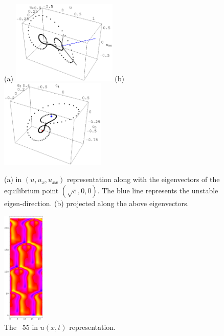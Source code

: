 \begin{figure}[t]
\begin{center}
(a) \includegraphics[width=5.0cm]{figs/1wSteadyE.eps}
\hspace{0.1in}
(b) \includegraphics[width=5.0cm]{figs/1wSteadyP.eps}
\end{center}
\caption{
(a)  in $(u,u_x,u_{xx})$ representation along with the eigenvectors of the equilibrium
point $(\sqrt{c},0,0)$. The blue line represents the unstable eigen-direction.
(b)  projected along the above eigenvectors.
}
\label{f:1wSteady}
\end{figure}


\begin{figure}[t]
\begin{center}
    \includegraphics[width=0.18\textwidth]{figs/rpo22-55-4-u.eps}
\end{center}
\caption{
 The \rpo\ {\nameit}55 in $u(x,t)$ representation.
        }
\label{f:rpo55u}
\end{figure}




